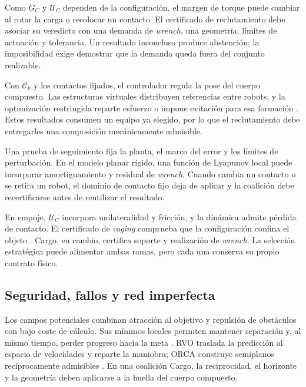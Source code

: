 Como \(G_C\) y \(\mathcal U_C\) dependen de la configuración, el margen de torque puede cambiar al rotar la carga o recolocar un contacto. El certificado de reclutamiento debe asociar su veredicto con una demanda de \emph{wrench}, una geometría, límites de actuación y tolerancia. Un resultado inconcluso produce abstención; la imposibilidad exige demostrar que la demanda queda fuera del conjunto realizable.

Con \(\mathcal C_k\) y los contactos fijados, el controlador regula la pose del cuerpo compuesto. Las estructuras virtuales distribuyen referencias entre robots, y la optimización restringida reparte esfuerzo o impone evitación para esa formación \parencite{alonsomora2017transport,ebel2024cooperative}. Estos resultados consumen un equipo ya elegido, por lo que el reclutamiento debe entregarles una composición mecánicamente admisible.

Una prueba de seguimiento fija la planta, el marco del error y los límites de perturbación. En el modelo planar rígido, una función de Lyapunov local puede incorporar amortiguamiento y residual de \emph{wrench}. Cuando cambia un contacto o se retira un robot, el dominio de contacto fijo deja de aplicar y la coalición debe recertificarse antes de reutilizar el resultado.

En empuje, \(\mathcal U_C\) incorpora unilateralidad y fricción, y la dinámica admite pérdida de contacto. El certificado de \emph{caging} comprueba que la configuración confina el objeto \parencite{pereira2004caging,fink2008caging}. Cargo, en cambio, certifica soporte y realización de \emph{wrench}. La selección estratégica puede alimentar ambas ramas, pero cada una conserva su propio contrato físico.

\subsection{Seguridad, fallos y red imperfecta}
\label{subsec:tf-industrial-constraints}

Los campos potenciales combinan atracción al objetivo y repulsión de obstáculos con bajo coste de cálculo. Sus mínimos locales permiten mantener separación y, al mismo tiempo, perder progreso hacia la meta \parencite{khatib1986obstacle}. RVO traslada la predicción al espacio de velocidades y reparte la maniobra; ORCA construye semiplanos recíprocamente admisibles \parencite{vandenberg2008rvo,vandenberg2011orca}. En una coalición Cargo, la reciprocidad, el horizonte y la geometría deben aplicarse a la huella del cuerpo compuesto.

